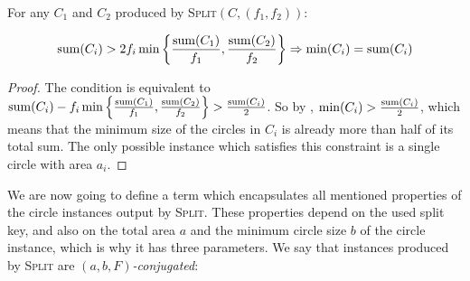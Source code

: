 \documentclass[a4paper,style=print,bibliography=totoc,nexus,lnum,extramargin]{tubsbook}
\begin{document}
\begin{lemma}\label{th:min2}
    For any $C_1$ and $C_2$ produced by \textsc{Split}$(C,(f_1,f_2))$:

    $$\operatorname{sum}(C_i) > 2f_i\min\left\{\frac{\operatorname{sum}(C_1)}{f_1},\frac{\operatorname{sum}(C_2)}{f_2}\right\} \Rightarrow \min(C_i) = \operatorname{sum}(C_i)$$
\end{lemma}

\begin{proof}
    The condition is equivalent to $\operatorname{sum}(C_i) - f_i\min\left\{\frac{\operatorname{sum}(C_1)}{f_1},\frac{\operatorname{sum}(C_2)}{f_2}\right\} > \frac{\operatorname{sum}(C_i)}{2}$. So by , $\min(C_i) > \frac{\operatorname{sum}(C_i)}{2}$, which means that the minimum size of the circles in $C_i$ is already more than half of its total sum. The only possible instance which satisfies this constraint is a single circle with area $a_i$.
\end{proof}

We are now going to define a term which encapsulates all mentioned properties of the circle instances output by \textsc{Split}. These properties depend on the used split key, and also on the total area $a$ and the minimum circle size $b$ of the circle instance, which is why it has three parameters. We say that instances produced by \textsc{Split} are \emph{$(a,b,F)$-conjugated}:

\end{document}
